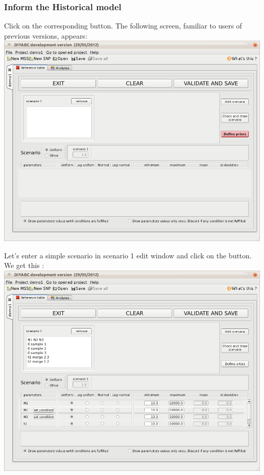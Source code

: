 \subsubsection{Inform the Historical model}

Click on the corresponding  button. The following
screen, familiar to users of previous versions, appears:\\


\includegraphics[scale=0.35]{gui_pictures/Capture-DIYABC-11}

Let's enter a simple scenario in scenario 1 edit window and click
on the  button. We get this :\\


\includegraphics[scale=0.35]{gui_pictures/Capture-DIYABC-12}

